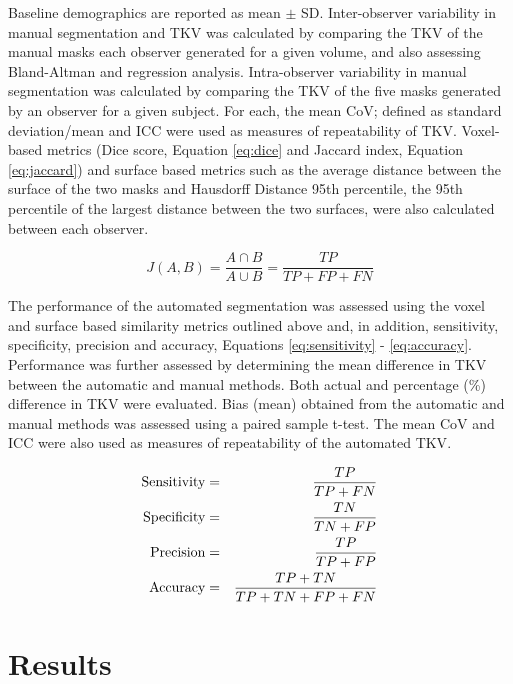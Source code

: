 Baseline demographics are reported as mean $\pm$ \ac{SD}. Inter-observer variability in manual segmentation and \ac{TKV} was calculated by comparing the \ac{TKV} of the manual masks each observer generated for a given volume, and also assessing Bland-Altman and regression analysis. Intra-observer variability in manual segmentation was calculated by comparing the \ac{TKV} of the five masks generated by an observer for a given subject. For each, the mean \ac{CoV}; defined as standard deviation/mean and \ac{ICC} were used as measures of repeatability of \ac{TKV}. Voxel-based metrics (Dice score, Equation \eqref{eq:dice} and Jaccard index, Equation \eqref{eq:jaccard}) and surface based metrics such as the average distance between the surface of the two masks and Hausdorff Distance 95th percentile, the 95th percentile of the largest distance between the two surfaces, were also calculated between each observer.

\begin{equation}
	J(A,B) = \frac{A\cap B}{A\cup B} = \frac{TP}{TP+FP+FN}
	\label{eq:jaccard}
\end{equation}
	
The performance of the automated segmentation was assessed using the voxel and surface based similarity metrics outlined above and, in addition, sensitivity, specificity, precision and accuracy, Equations \eqref{eq:sensitivity} - \eqref{eq:accuracy}. Performance was further assessed by determining the mean difference in \ac{TKV} between the automatic and manual methods. Both actual and percentage (\%) difference in \ac{TKV} were evaluated. Bias (mean) obtained from the automatic and manual methods was assessed using a paired sample t-test. The mean \ac{CoV} and \ac{ICC} were also used as measures of repeatability of the automated \ac{TKV}.

\begin{eqnarray}
	\textup{Sensitivity} &=& \frac{TP}{TP + FN}
	\label{eq:sensitivity}\\
	\textup{Specificity} &=& \frac{TN}{TN + FP}
	\label{eq:specificity}\\
	\textup{Precision} &=& \frac{TP}{TP + FP}
	\label{eq:precision}\\
	\textup{Accuracy} &=& \frac{TP + TN}{TP + TN + FP + FN}
	\label{eq:accuracy}
\end{eqnarray}

\newpage
\section{Results}

